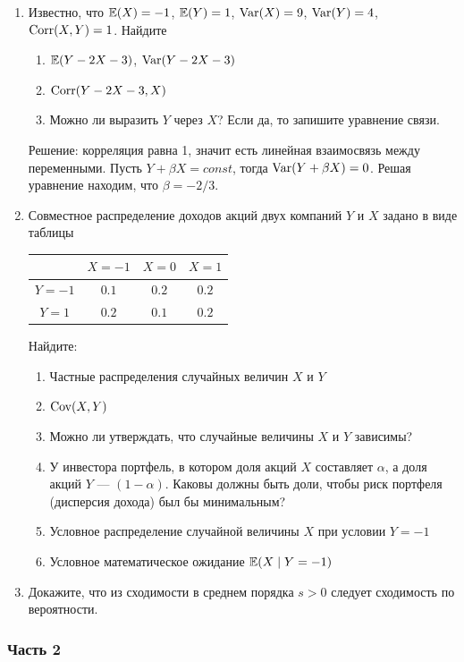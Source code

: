 \documentclass[12pt, a4paper]{article}\usepackage[]{graphicx}\usepackage[]{color}
\begin{document}
\begin{enumerate}
\item Известно, что  $\mathbb{E}(X)=-1$, $\mathbb{E}(Y)=1$, $\operatorname{Var}(X)=9$, $\operatorname{Var}(Y)=4$, $\operatorname{Corr}(X,Y)=1$. Найдите
\begin{enumerate}
\item $\mathbb{E}(Y-2X-3)$, $\operatorname{Var}(Y-2X-3)$
\item  $\operatorname{Corr}(Y-2X-3,X)$
\item Можно ли выразить $Y$ через $X$? Если да, то запишите уравнение связи.
\end{enumerate}

Решение: корреляция равна 1, значит есть линейная взаимосвязь между переменными. Пусть $Y+\beta X=const$, тогда $\operatorname{Var}(Y+\beta X)=0$. Решая уравнение находим, что $\beta=-2/3$.

\item Совместное распределение доходов акций двух компаний $Y$ и $X$ задано в виде таблицы

\begin{tabular}{c|ccc}
 & $X=-1$ & $X=0$ & $X=1$ \\
\hline
$Y=-1$ & $0.1$ & $0.2$ & $0.2$ \\
$Y=1$ & $0.2$ & $0.1$ & $0.2$ \\
\end{tabular}

Найдите:
\begin{enumerate}
\item Частные распределения случайных величин $X$ и $Y$
\item $\operatorname{Cov}(X,Y)$
\item Можно ли утверждать, что случайные величины $X$ и $Y$ зависимы?
\item У инвестора портфель, в котором доля акций $X$ составляет $
\alpha$, а доля акций $Y$ — $(1-\alpha)$. Каковы должны быть доли, чтобы риск портфеля (дисперсия дохода) был бы минимальным?
\item Условное распределение случайной величины $X$ при условии $Y=-1$
\item Условное математическое ожидание $\mathbb{E}(X\mid Y=-1)$
\end{enumerate}

\item Докажите, что из сходимости в среднем порядка $s>0$ следует сходимость по вероятности.

\end{enumerate}


\subsubsection*{Часть 2}
\end{document}

